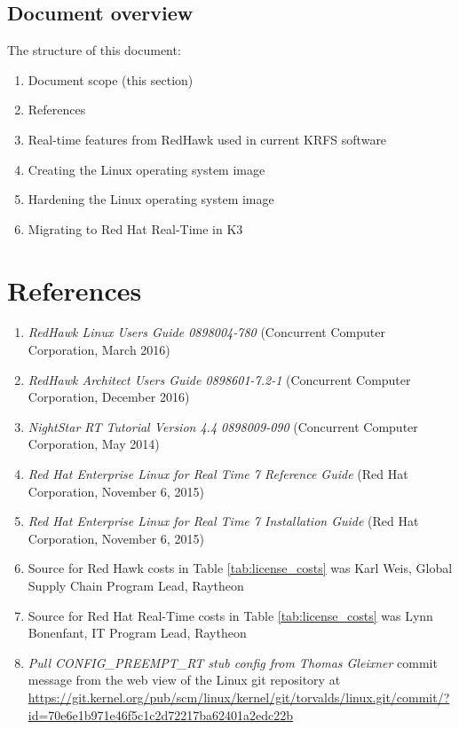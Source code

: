 \documentclass[12pt]{article}
\begin{document}
\subsection{Document overview}
The structure of this document:

\begin{enumerate}
    \item Document scope (this section)
    \item References
    \item Real-time features from RedHawk used in current KRFS software
    \item Creating the Linux operating system image
    \item Hardening the Linux operating system image
    \item Migrating to Red Hat Real-Time in K3
\end{enumerate}



%
\newpage
\section{References}

\begin{enumerate}
    \item \textit{RedHawk Linux Users Guide 0898004-780} (Concurrent Computer Corporation, March 2016) \label{ref:red_hawk_guide}
    \item \textit{RedHawk Architect Users Guide 0898601-7.2-1} (Concurrent Computer Corporation, December 2016) \label{ref:architect}
    \item \textit{NightStar RT Tutorial Version 4.4 0898009-090} (Concurrent Computer Corporation, May 2014) \label{ref:nightstar}
    \item \textit{Red Hat Enterprise Linux for Real Time 7 Reference Guide} (Red Hat Corporation, November 6, 2015) \label{ref:rhel7_ref}
    \item \textit{Red Hat Enterprise Linux for Real Time 7 Installation Guide} (Red Hat Corporation, November 6, 2015) \label{ref:rhel7_install}
    \item Source for Red Hawk costs in Table \ref{tab:license_costs} was Karl Weis, Global Supply Chain Program Lead, Raytheon \label{ref:karl}
    \item Source for Red Hat Real-Time costs in Table \ref{tab:license_costs} was Lynn Bonenfant, IT Program Lead, Raytheon \label{ref:lynn}
    \item \textit{Pull CONFIG\_PREEMPT\_RT stub config from Thomas Gleixner} commit message from the web view of the Linux git repository at \url{https://git.kernel.org/pub/scm/linux/kernel/git/torvalds/linux.git/commit/?id=70e6e1b971e46f5c1c2d72217ba62401a2edc22b} \label{ref:commit}
\end{enumerate}
\end{document}
